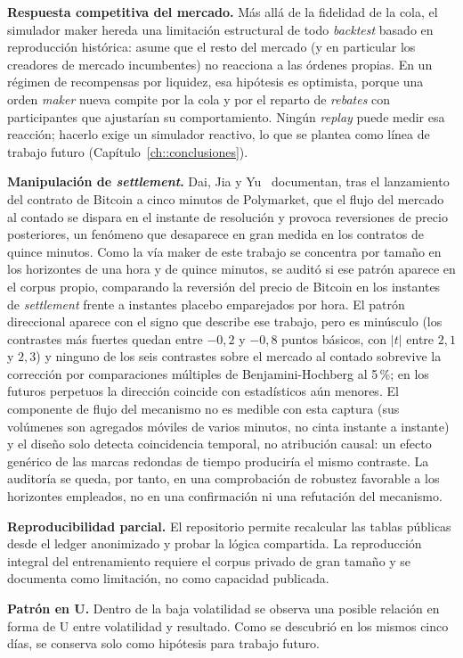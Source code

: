 \textbf{Respuesta competitiva del mercado.} Más allá de la fidelidad de la cola, el
simulador maker hereda una limitación estructural de todo \emph{backtest} basado en
reproducción histórica: asume que el resto del mercado (y en particular los creadores de
mercado incumbentes) no reacciona a las órdenes propias. En un régimen de recompensas por
liquidez, esa hipótesis es optimista, porque una orden \emph{maker} nueva compite por la
cola y por el reparto de \emph{rebates} con participantes que ajustarían su comportamiento.
Ningún \emph{replay} puede medir esa reacción; hacerlo exige un simulador reactivo, lo que
se plantea como línea de trabajo futuro (Capítulo~\ref{ch::conclusiones}).

\textbf{Manipulación de \emph{settlement}.} Dai, Jia y Yu~\cite{dai2026settlement}
documentan, tras el lanzamiento del contrato de Bitcoin a cinco minutos de Polymarket,
que el flujo del mercado al contado se dispara en el instante de resolución y provoca
reversiones de precio posteriores, un fenómeno que desaparece en gran medida en los
contratos de quince minutos. Como la vía maker de este trabajo se concentra por tamaño
en los horizontes de una hora y de quince minutos, se auditó si ese patrón aparece en el
corpus propio, comparando la reversión del precio de Bitcoin en los instantes de
\emph{settlement} frente a instantes placebo emparejados por hora. El patrón direccional
aparece con el signo que describe ese trabajo, pero es minúsculo (los contrastes más
fuertes quedan entre $-0{,}2$ y $-0{,}8$ puntos básicos, con $|t|$ entre $2{,}1$ y
$2{,}3$) y ninguno de los seis contrastes sobre el mercado al contado sobrevive la
corrección por comparaciones múltiples de Benjamini-Hochberg al 5\,\%; en los futuros
perpetuos la dirección coincide con estadísticos aún menores. El componente de flujo del
mecanismo no es medible con esta captura (sus volúmenes son agregados móviles de varios
minutos, no cinta instante a instante) y el diseño solo detecta coincidencia temporal,
no atribución causal: un efecto genérico de las marcas redondas de tiempo produciría el
mismo contraste. La auditoría se queda, por tanto, en una comprobación de robustez
favorable a los horizontes empleados, no en una confirmación ni una refutación del
mecanismo.

\textbf{Reproducibilidad parcial.} El repositorio permite recalcular las tablas públicas desde
el ledger anonimizado y probar la lógica compartida. La reproducción integral del
entrenamiento requiere el corpus privado de gran tamaño y se documenta como limitación, no
como capacidad publicada.

\textbf{Patrón en U.} Dentro de la baja volatilidad se observa una posible relación en forma de
U entre volatilidad y resultado. Como se descubrió en los mismos cinco días, se conserva solo
como hipótesis para trabajo futuro.
